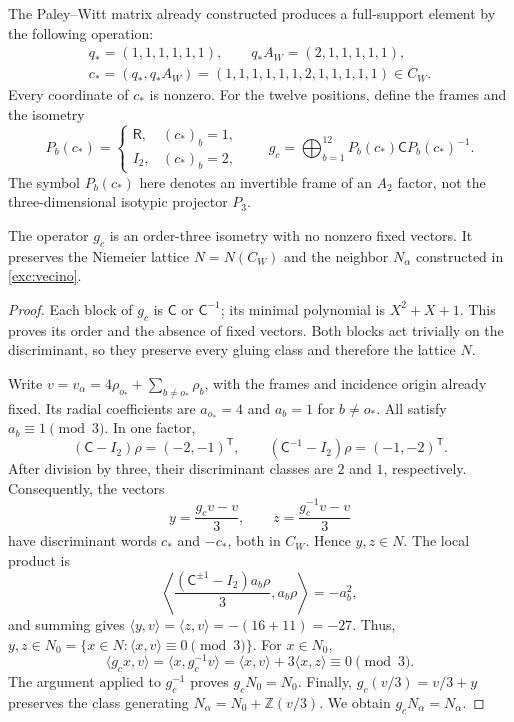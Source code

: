 The Paley--Witt matrix already constructed produces a full-support
element by the following operation:
\begin{equation}
 \begin{gathered}
 q_*=(1,1,1,1,1,1),\qquad q_*A_W=(2,1,1,1,1,1),\\
 c_*=(q_*,q_*A_W)
 =(1,1,1,1,1,1,2,1,1,1,1,1)\in C_W.
 \end{gathered}
 \label{km:palabra-total}
\end{equation}
Every coordinate of \(c_*\) is nonzero. For the twelve positions,
define the frames and the isometry
\begin{equation}
 P_b(c_*)=
 \begin{cases}\mathsf R,&(c_*)_b=1,\\I_2,&(c_*)_b=2,\end{cases}
 \qquad
 g_c=\bigoplus_{b=1}^{12}P_b(c_*)\mathsf C P_b(c_*)^{-1}.
 \label{km:isometria-ternaria}
\end{equation}
The symbol \(P_b(c_*)\) here denotes an invertible frame of an
\(A_2\) factor, not the three-dimensional isotypic projector \(P_3\).

\begin{proposition}
\label{km:estabilidad-vecino}
The operator \(g_c\) is an order-three isometry with no nonzero
fixed vectors. It preserves the Niemeier lattice \(N=N(C_W)\) and the
neighbor \(N_\alpha\) constructed in \eqref{exc:vecino}.
\end{proposition}
\begin{proof}
Each block of \(g_c\) is \(\mathsf C\) or \(\mathsf C^{-1}\);
its minimal polynomial is \(X^2+X+1\). This proves its order and
the absence of fixed vectors. Both blocks act trivially on the
discriminant, so they preserve every gluing class and therefore
the lattice \(N\).

Write \(v=v_\alpha=4\rho_{o_*}+\sum_{b\ne o_*}\rho_b\),
with the frames and incidence origin already fixed. Its radial
coefficients are \(a_{o_*}=4\) and \(a_b=1\) for \(b\ne o_*\).
All satisfy \(a_b\equiv1\pmod3\). In one factor,
\[
 (\mathsf C-I_2)\rho=(-2,-1)^{\mathsf T},\qquad
 (\mathsf C^{-1}-I_2)\rho=(-1,-2)^{\mathsf T}.
\]
After division by three, their discriminant classes are
\(2\) and \(1\), respectively. Consequently, the vectors
\begin{equation}
 y=\frac{g_cv-v}{3},\qquad z=\frac{g_c^{-1}v-v}{3}
 \label{km:desplazamientos}
\end{equation}
have discriminant words \(c_*\) and \(-c_*\), both in
\(C_W\). Hence \(y,z\in N\). The local product is
\[
 \left\langle
 \frac{(\mathsf C^{\pm1}-I_2)a_b\rho}{3},a_b\rho
 \right\rangle=-a_b^2,
\]
and summing gives
\(\langle y,v\rangle=\langle z,v\rangle=-(16+11)=-27\).
Thus, \(y,z\in N_0=\{x\in N:\langle x,v\rangle\equiv0\pmod3\}\).
For \(x\in N_0\),
\[
 \langle g_cx,v\rangle
 =\langle x,g_c^{-1}v\rangle
 =\langle x,v\rangle+3\langle x,z\rangle\equiv0\pmod3.
\]
The argument applied to \(g_c^{-1}\) proves \(g_cN_0=N_0\).
Finally, \(g_c(v/3)=v/3+y\) preserves the class generating
\(N_\alpha=N_0+\mathbb Z(v/3)\). We obtain
\(g_cN_\alpha=N_\alpha\).
\end{proof}

